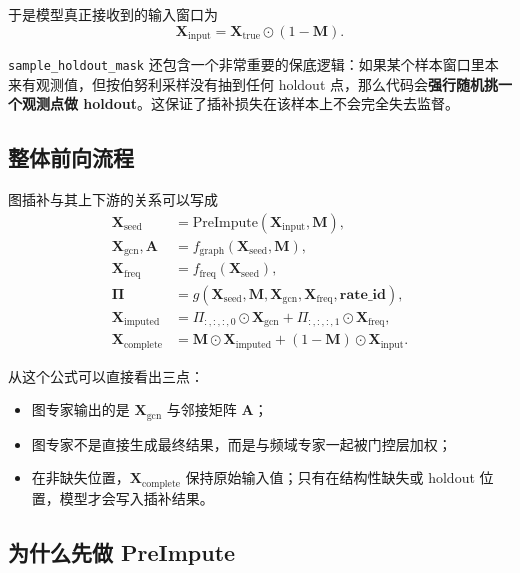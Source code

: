 \documentclass[UTF8]{ctexart}
\begin{document}
于是模型真正接收到的输入窗口为
\begin{equation}
    \bm{X}_{\text{input}} = \bm{X}_{\text{true}} \odot (1-\bm{M}).
\end{equation}

\texttt{sample\_holdout\_mask} 还包含一个非常重要的保底逻辑：如果某个样本窗口里本来有观测值，但按伯努利采样没有抽到任何 holdout 点，那么代码会\textbf{强行随机挑一个观测点做 holdout}。这保证了插补损失在该样本上不会完全失去监督。

\subsection{整体前向流程}

图插补与其上下游的关系可以写成
\begin{equation}
    \begin{aligned}
        \bm{X}_{\text{seed}} &= \text{PreImpute}(\bm{X}_{\text{input}},\bm{M}), \\
        \bm{X}_{\text{gcn}}, \bm{A} &= f_{\text{graph}}(\bm{X}_{\text{seed}},\bm{M}), \\
        \bm{X}_{\text{freq}} &= f_{\text{freq}}(\bm{X}_{\text{seed}}), \\
        \bm{\Pi} &= g(\bm{X}_{\text{seed}},\bm{M},\bm{X}_{\text{gcn}},\bm{X}_{\text{freq}},\bm{rate\_id}), \\
        \bm{X}_{\text{imputed}} &= \Pi_{:,:,:,0}\odot \bm{X}_{\text{gcn}} + \Pi_{:,:,:,1}\odot \bm{X}_{\text{freq}}, \\
        \bm{X}_{\text{complete}} &= \bm{M}\odot \bm{X}_{\text{imputed}} + (1-\bm{M})\odot \bm{X}_{\text{input}}.
    \end{aligned}
\end{equation}

从这个公式可以直接看出三点：
\begin{itemize}
    \item 图专家输出的是 \(\bm{X}_{\text{gcn}}\) 与邻接矩阵 \(\bm{A}\)；
    \item 图专家不是直接生成最终结果，而是与频域专家一起被门控层加权；
    \item 在非缺失位置，\(\bm{X}_{\text{complete}}\) 保持原始输入值；只有在结构性缺失或 holdout 位置，模型才会写入插补结果。
\end{itemize}

\subsection{为什么先做 PreImpute}
\end{document}
